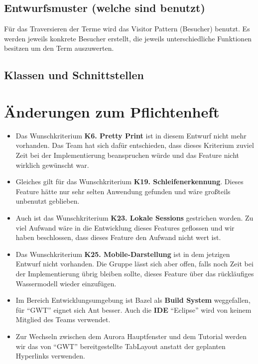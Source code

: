 \documentclass[parskip=full,11pt,twoside]{scrbook}
\begin{document}
\subsection{Entwurfsmuster (welche sind benutzt)}
Für das Traversieren der Terme wird das Visitor Pattern (Besucher) benutzt. Es werden jeweils konkrete Besucher erstellt, die jeweils unterschiedliche Funktionen besitzen um den Term auszuwerten.
\subsection{Klassen und Schnittstellen}
\pagebreak

\section{Änderungen zum Pflichtenheft}
    \begin{itemize}
        \item Das Wunschkriterium \textbf{K6. Pretty Print} ist in diesem Entwurf nicht mehr vorhanden.
            Das Team hat sich dafür entschieden, dass dieses Kriterium zuviel Zeit bei der Implementierung beanspruchen würde und das Feature nicht wirklich gewünscht war.

        \item Gleiches gilt für das Wunschkriterium \textbf{K19. Schleifenerkennung}.
            Dieses Feature hätte nur sehr selten Anwendung gefunden und wäre großteils unbenutzt geblieben.

        \item Auch ist das Wunschkriterium \textbf{K23. Lokale Sessions} gestrichen worden. 
            Zu viel Aufwand wäre in die Entwicklung dieses Features geflossen und wir haben beschlossen, dass dieses Feature den Aufwand nicht wert ist.

        \item Das Wunschkriterium \textbf{K25. Mobile-Darstellung} ist in dem jetzigen Entwurf nicht vorhanden.
            Die Gruppe lässt sich aber offen, falls noch Zeit bei der Implementierung übrig bleiben sollte, dieses Feature über das rückläufiges Wassermodell wieder einzufügen.

        \item Im Bereich Entwicklungsumgebung ist Bazel als \textbf{Build System} weggefallen, für \enquote{GWT} eignet sich Ant besser.
            Auch die \textbf{IDE} \enquote{Eclipse} wird von keinem Mitglied des Teams verwendet.

        \item Zur Wechseln zwischen dem Aurora Hauptfenster und dem Tutorial werden wir das von \enquote{GWT} bereitgestellte TabLayout anstatt der geplanten Hyperlinks verwenden.
    \end{itemize}
\end{document}
